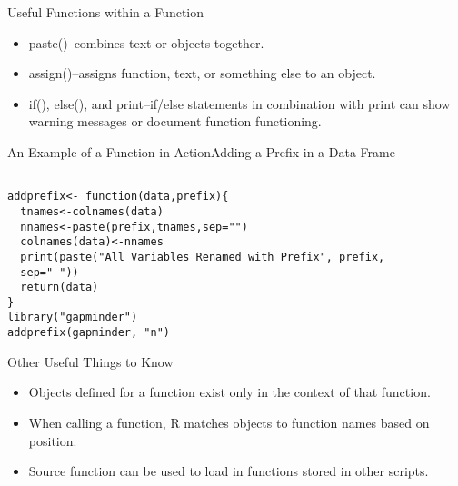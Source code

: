 \documentclass{beamer}
\begin{document}
\begin{frame}{Useful Functions within a Function}
\begin{itemize}
    \item paste()--combines text or objects together.
    \item assign()--assigns function, text, or something else to an object.
    \item if(), else(), and print--if/else statements in combination with print can show warning messages or document function functioning.
\end{itemize}
\end{frame}
\begin{frame}[fragile]{An Example of a Function in Action}{Adding a Prefix in a Data Frame}
\lstset{language=R} 
\begin{lstlisting}

addprefix<- function(data,prefix){
  tnames<-colnames(data)
  nnames<-paste(prefix,tnames,sep="")
  colnames(data)<-nnames
  print(paste("All Variables Renamed with Prefix", prefix,
  sep=" "))
  return(data)
}
library("gapminder")
addprefix(gapminder, "n")
\end{lstlisting}
\end{frame}
\begin{frame}{Other Useful Things to Know}
    \begin{itemize}
        \item Objects defined for a function exist only in the context of that function.
        \item When calling a function, R matches objects to function names based on position.
        \item Source function can be used to load in functions stored in other scripts.
    \end{itemize}
\end{frame}
\end{document}
